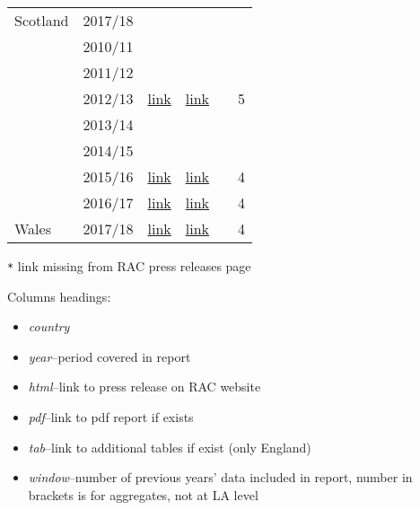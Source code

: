 \documentclass[]{article}
\providecommand{\tightlist}{%
  \setlength{\itemsep}{0pt}\setlength{\parskip}{0pt}}
\begin{document}
\begin{tabular}{llllll}
\cmidrule{2-6}
\multirow{-8}{*}{\raggedright\arraybackslash Scotland} & 2017/18 &  &  &  & \\
\cmidrule{1-6}
 & 2010/11 &  &  &  & \\
\cmidrule{2-6}
 & 2011/12 &  &  &  & \\
\cmidrule{2-6}
 & 2012/13 & \href{https://www.racfoundation.org/media-centre/welsh-councils-parking-accounts-2012-13-press-release}{link} & \href{https://www.racfoundation.org/assets/rac_foundation/content/downloadables/local_parking_finances_wales_2012-13_leibling.pdf}{link} &  & 5\\
\cmidrule{2-6}
 & 2013/14 &  &  &  & \\
\cmidrule{2-6}
 & 2014/15 &  &  &  & \\
\cmidrule{2-6}
 & 2015/16 & \href{https://www.racfoundation.org/media-centre/welsh-council-parking-profits-up-for-third-year}{link} & \href{https://www.racfoundation.org/wp-content/uploads/2017/11/Local_authority_parking_finances_Wales-2015-16_Leibling.pdf}{link} &  & 4\\
\cmidrule{2-6}
 & 2016/17 & \href{https://www.racfoundation.org/media-centre/welsh-councils-parking-profits-inch-upwards-2016-2017}{link} & \href{https://www.racfoundation.org/wp-content/uploads/2017/11/Local_authority_parking_finances_Wales_2016-17_final_report.pdf}{link} &  & 4\\
\cmidrule{2-6}
\multirow{-8}{*}{\raggedright\arraybackslash Wales} & 2017/18 & \href{https://www.racfoundation.org/media-centre/welsh-council-parking-profits-up-five-years-running}{link} & \href{https://www.racfoundation.org/wp-content/uploads/Local_authority_parking_finances_Wales_2017-18_final.pdf}{link} &  & 4\\
\bottomrule
\end{tabular}

\texttt{*} link missing from RAC press releases page

Columns headings:

\begin{itemize}
\tightlist
\item
  \emph{country}
\item
  \emph{year}--period covered in report
\item
  \emph{html}--link to press release on RAC website
\item
  \emph{pdf}--link to pdf report if exists
\item
  \emph{tab}--link to additional tables if exist (only England)
\item
  \emph{window}--number of previous years' data included in report,
  number in brackets is for aggregates, not at LA level
\end{itemize}
\end{document}
